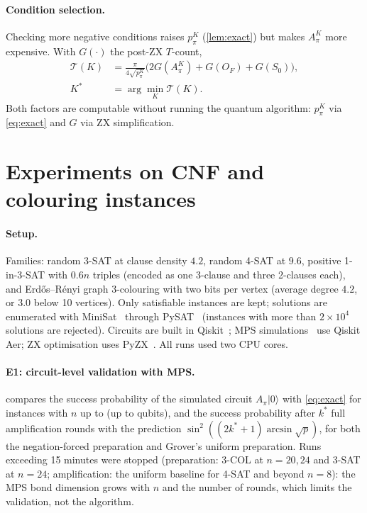 \paragraph{Condition selection.} Checking more negative conditions raises $p^K_\pi$ (\cref{lem:exact}) but makes $A^K_\pi$ more expensive. With $G(\cdot)$ the post-ZX $T$-count,
\begin{equation}
\begin{aligned}\mathcal T(K)&=\frac{\pi}{4\sqrt{p^K_\pi}}\big(2G(A^K_\pi)+G(O_F)+G(S_0)\big),\\ K^*&=\arg\min_K\mathcal T(K).\end{aligned}\label{eq:select}
\end{equation}
Both factors are computable without running the quantum algorithm: $p^K_\pi$ via \cref{eq:exact} and $G$ via ZX simplification.

\section{Experiments on CNF and colouring instances}\label{sec:exp}
\paragraph{Setup.} Families: random 3-SAT at clause density $4.2$, random 4-SAT at $9.6$, positive 1-in-3-SAT with $0.6n$ triples (encoded as one 3-clause and three 2-clauses each), and Erd\H{o}s--R\'enyi graph 3-colouring with two bits per vertex (average degree $4.2$, or $3.0$ below 10 vertices). Only satisfiable instances are kept; solutions are enumerated with MiniSat~\cite{minisat} through PySAT~\cite{pysat} (instances with more than $2\times10^4$ solutions are rejected). Circuits are built in Qiskit~\cite{qiskit2024}; MPS simulations~\cite{vidal2003} use Qiskit Aer; ZX optimisation uses PyZX~\cite{pyzx}. All runs used two CPU cores.

\paragraph{E1: circuit-level validation with MPS.}  compares the success probability of the simulated circuit $A_\pi|0\rangle$ with \cref{eq:exact} for \NMPSA{} instances with $n$ up to \MaxMPSn{} (up to \MaxMPSQubits{} qubits), and the success probability after $k^*$ full amplification rounds with the prediction $\sin^2((2k^*+1)\arcsin\sqrt p)$, for both the negation-forced preparation and Grover's uniform preparation. \MPSAgreement{} Runs exceeding 15 minutes were stopped (preparation: 3-COL at $n=20,24$ and 3-SAT at $n=24$; amplification: the uniform baseline for 4-SAT and beyond $n=8$): the MPS bond dimension grows with $n$ and the number of rounds, which limits the validation, not the algorithm.

